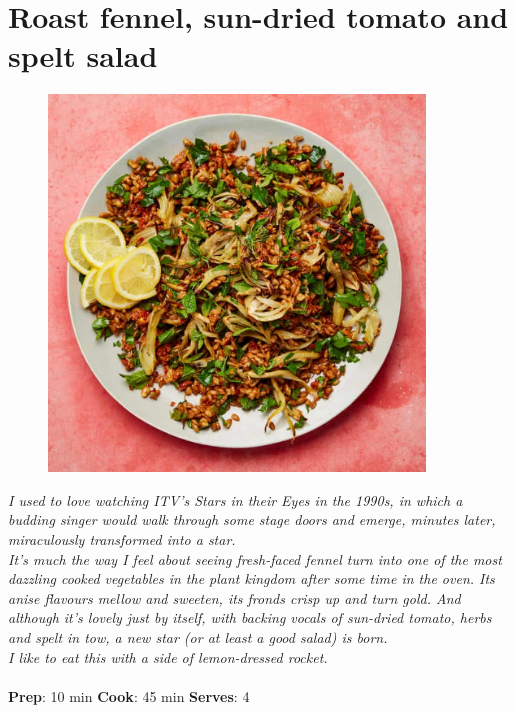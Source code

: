 \documentclass{book}
\begin{document}
\section{Roast fennel, sun-dried tomato and spelt salad}
\begin{figure}
\centering\includegraphics[width=10cm,height=10cm,keepaspectratio]{Recipe_Pictures/Roast_fennel,_sun-dried_tomato_and_spelt_salad.png}
\end{figure}
\emph{I used to love watching ITV’s Stars in their Eyes in the 1990s, in which a budding singer would walk through some stage doors and emerge, minutes later, miraculously transformed into a star.\\ 
It’s much the way I feel about seeing fresh-faced fennel turn into one of the most dazzling cooked vegetables in the plant kingdom after some time in the oven. Its anise flavours mellow and sweeten, its fronds crisp up and turn gold. And although it’s lovely just by itself, with backing vocals of sun-dried tomato, herbs and spelt in tow, a new star (or at least a good salad) is born.\\ 
I like to eat this with a side of lemon-dressed rocket.}\\\\ 
\textbf{Prep}: 10 min
\textbf{Cook}: 45 min
\textbf{Serves}: 4
\end{document}
